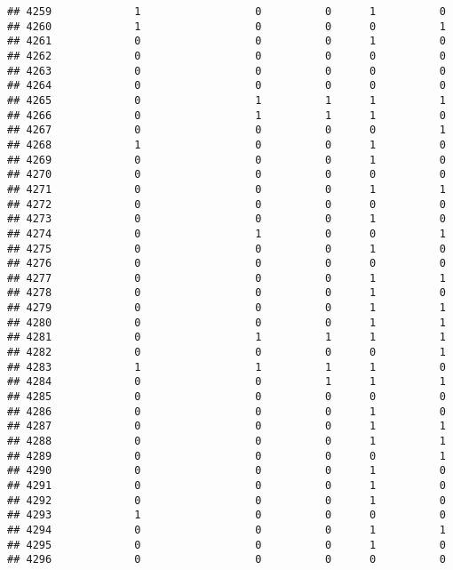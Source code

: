 \documentclass[
]{article}
\begin{document}
\begin{verbatim}
## 4259             1                  0          0      1          0
## 4260             1                  0          0      0          1
## 4261             0                  0          0      1          0
## 4262             0                  0          0      0          0
## 4263             0                  0          0      0          0
## 4264             0                  0          0      0          0
## 4265             0                  1          1      1          1
## 4266             0                  1          1      1          0
## 4267             0                  0          0      0          1
## 4268             1                  0          0      1          0
## 4269             0                  0          0      1          0
## 4270             0                  0          0      0          0
## 4271             0                  0          0      1          1
## 4272             0                  0          0      0          0
## 4273             0                  0          0      1          0
## 4274             0                  1          0      0          1
## 4275             0                  0          0      1          0
## 4276             0                  0          0      0          0
## 4277             0                  0          0      1          1
## 4278             0                  0          0      1          0
## 4279             0                  0          0      1          1
## 4280             0                  0          0      1          1
## 4281             0                  1          1      1          1
## 4282             0                  0          0      0          1
## 4283             1                  1          1      1          0
## 4284             0                  0          1      1          1
## 4285             0                  0          0      0          0
## 4286             0                  0          0      1          0
## 4287             0                  0          0      1          1
## 4288             0                  0          0      1          1
## 4289             0                  0          0      0          1
## 4290             0                  0          0      1          0
## 4291             0                  0          0      1          0
## 4292             0                  0          0      1          0
## 4293             1                  0          0      0          0
## 4294             0                  0          0      1          1
## 4295             0                  0          0      1          0
## 4296             0                  0          0      0          0

\end{verbatim}
\end{document}
